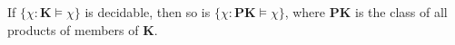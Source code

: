 If $\{\chi : \mathbf{K} \models \chi\}$ is decidable, then so is $\{\chi : \mathbf{PK} \models \chi\}$, where $\mathbf{PK}$ is the class of all products of members of $\mathbf{K}$.
